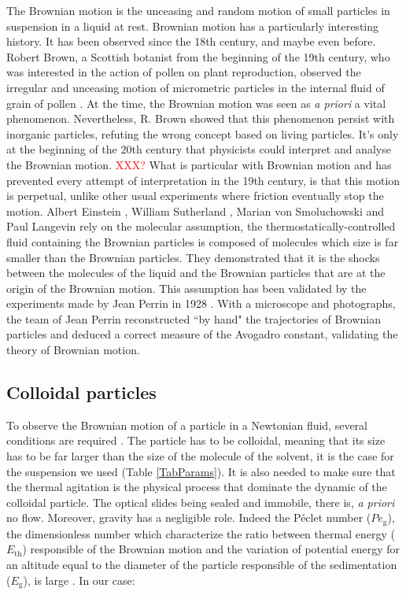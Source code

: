 \documentclass[%
 aip,
 jmp,%
 amsmath,amssymb,
reprint,%
]{revtex4-1}
\begin{document}
The Brownian motion is the unceasing and random motion of small particles in suspension in a liquid at rest. Brownian motion has a particularly interesting history. It has been observed since the 18th century, and maybe even before. Robert Brown, a Scottish botanist from the beginning of the 19th century, who was interested in the action of pollen on plant reproduction, observed the irregular and unceasing motion of micrometric particles in the internal fluid of grain of pollen \citep{13_brown1828brief}. At the time, the Brownian motion was seen as \textit{a priori} a vital phenomenon. Nevertheless, R. Brown showed that this phenomenon persist with inorganic particles, refuting the wrong concept based on living particles. It's only at the beginning of the 20th century that physicists could interpret and analyse the Brownian motion. \textcolor{red}{XXX?} What is particular with Brownian motion and has prevented every attempt of interpretation in the 19th century, is that this motion is perpetual, unlike other usual experiments where friction eventually stop the motion. Albert Einstein \citep{9_einstein1906theory}, William Sutherland \citep{14_sutherland1905lxxv}, Marian von Smoluchowski \citep{10_von1906kinetischen} and Paul Langevin \citep{15_Langevin} rely on the molecular assumption, the thermostatically-controlled fluid containing the Brownian particles is composed of molecules which size is far smaller than the Brownian particles. They demonstrated that it is the shocks between the molecules of the liquid and the Brownian particles that are at the origin of the Brownian motion. This assumption has been validated by the experiments made by Jean Perrin in 1928 \citep{22_perrin2014atomes}. With a microscope and photographs, the team of Jean Perrin reconstructed ``by hand" the trajectories of Brownian particles and deduced a correct measure of the Avogadro constant, validating the theory of Brownian motion.

\subsection{Colloidal particles}

To observe the Brownian motion of a particle in a Newtonian fluid, several conditions are required \citep{16_CollSusp}. The particle has to be colloidal, meaning that its size has to be far larger than the size of the molecule of the solvent, it is the case for the suspension we used (Table \ref{TabParams}). It is also needed to make sure that the thermal agitation is the physical process that dominate the dynamic of the colloidal particle. The optical slides being sealed and immobile, there is, \textit{a priori} no flow. Moreover, gravity has a negligible role. Indeed the P\'eclet number ($Pe_\text{g}$), the dimensionless number which characterize the ratio between thermal energy ($E_\text{th}$) responsible of the Brownian motion and the variation of potential energy for an altitude equal to the diameter of the particle responsible of the sedimentation ($E_\text{g}$), is large \citep{12_patankar1980numerical}. In our case:
\end{document}
